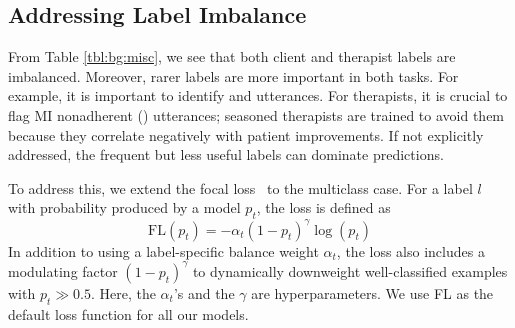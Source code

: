 \subsection{Addressing Label Imbalance}
\label{ssec:focal_loss}
From Table \ref{tbl:bg:misc}, we see that both client and therapist
labels are imbalanced. Moreover, rarer labels are more important in
both tasks. For example, it is important to identify \CHANGE and
\SUSTAIN utterances. For therapists, it is crucial to flag MI
nonadherent (\MIN) utterances; seasoned therapists are trained to
avoid them because they correlate negatively with patient
improvements. If not explicitly addressed, the frequent but less
useful labels can dominate predictions.


To address this, we extend the focal loss~\cite[FL][]{lin2017focal}
to the multiclass case. For a label $l$ with probability produced by
a model $p_t$, the loss is defined as
\begin{equation}
 \label{eq:focal}
\text{FL}(p_{t}) = -\alpha_{t} {(1 -p_{t})}^{\gamma} \log(p_{t})
\end{equation}
In addition to using a label-specific balance weight $\alpha_t$, the
loss also includes a modulating factor ${(1-p_{t})}^{\gamma}$ to
dynamically downweight well-classified examples with
$p_{t}\gg0.5$. Here, the $\alpha_t$'s and the $\gamma$ are
hyperparameters. We use FL as the default loss function for all our
models.

